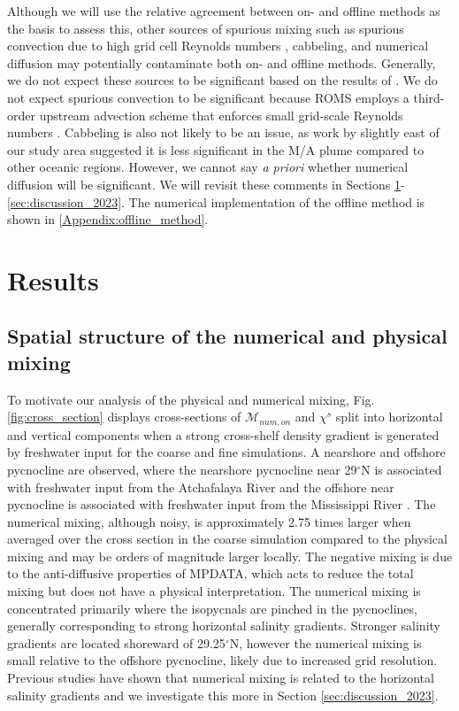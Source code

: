Although we will use the relative agreement between on- and offline methods as the basis to assess this, other sources of spurious mixing such as spurious convection due to high grid cell Reynolds numbers \citep{ilicak2016quantifying, Ilicak_2012}, cabbeling, and numerical diffusion may potentially contaminate both on- and offline methods. Generally, we do not expect these sources to be significant based on the results of \citet{Wang_2021}. We do not expect spurious convection to be significant because ROMS employs a third-order upstream advection scheme that enforces small grid-scale Reynolds numbers \citep{Ilicak_2012,shchepetkin2005regional}. Cabbeling is also not likely to be an issue, as work by \citet{barkan2017submesoscalepart2} slightly east of our study area suggested it is less significant in the M/A plume compared to other oceanic regions. However, we cannot say \textit{a priori} whether numerical diffusion will be significant. We will revisit these comments in Sections \ref{sec:results_2023}-\ref{sec:discussion_2023}. The numerical implementation of the offline method is shown in \ref{Appendix:offline_method}.

\section{Results} \label{sec:results_2023}

\subsection{Spatial structure of the numerical and physical mixing}

To motivate our analysis of the physical and numerical mixing, Fig. \ref{fig:cross_section} displays cross-sections of $\mathcal{M}_{num, on}$ and $\chi^s$ split into horizontal and vertical components when a strong cross-shelf density gradient is generated by freshwater input for the coarse and fine simulations. A nearshore and offshore pycnocline are observed, where the nearshore pycnocline near 29$^\circ$N is associated with freshwater input from the Atchafalaya River and the offshore near pycnocline is associated with freshwater input from the Mississippi River \citep{Kobashi_2020}. The numerical mixing, although noisy, is approximately 2.75 times larger when averaged over the cross section in the coarse simulation compared to the physical mixing and may be orders of magnitude larger locally. The negative mixing is due to the anti-diffusive properties of MPDATA, which acts to reduce the total mixing but does not have a physical interpretation. The numerical mixing is concentrated primarily where the isopycnals are pinched in the pycnoclines, generally corresponding to strong horizontal salinity gradients. Stronger salinity gradients are located shoreward of 29.25$^{\circ}$N, however the numerical mixing is small relative to the offshore pycnocline, likely due to increased grid resolution. Previous studies have shown that numerical mixing is related to the horizontal salinity gradients \citep{hofmeister2011realistic, Kalra_2019, Klingbeil_2014,Wang_2021} and we investigate this more in Section \ref{sec:discussion_2023}.

